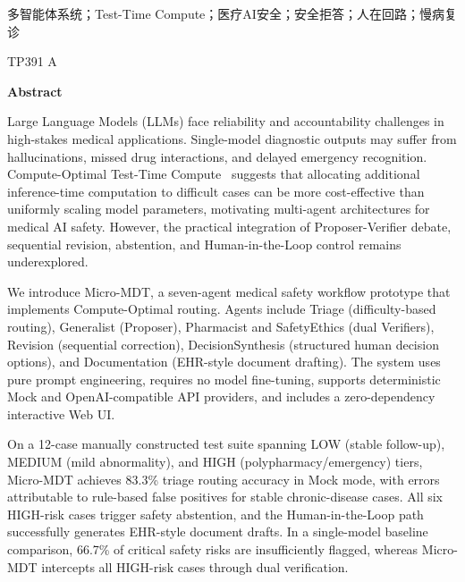 \documentclass[11pt,a4paper]{ctexart}
\begin{document}
\vspace{1em}
 多智能体系统；Test-Time Compute；医疗AI安全；安全拒答；人在回路；慢病复诊

\vspace{1em}
 TP391  A

\newpage
\begin{center}
    {\large \textbf{Abstract}}
\end{center}

 Large Language Models (LLMs) face reliability and accountability challenges in high-stakes medical applications. Single-model diagnostic outputs may suffer from hallucinations, missed drug interactions, and delayed emergency recognition. Compute-Optimal Test-Time Compute~\cite{snell2024scaling} suggests that allocating additional inference-time computation to difficult cases can be more cost-effective than uniformly scaling model parameters, motivating multi-agent architectures for medical AI safety. However, the practical integration of Proposer-Verifier debate, sequential revision, abstention, and Human-in-the-Loop control remains underexplored.

 We introduce Micro-MDT, a seven-agent medical safety workflow prototype that implements Compute-Optimal routing. Agents include Triage (difficulty-based routing), Generalist (Proposer), Pharmacist and SafetyEthics (dual Verifiers), Revision (sequential correction), DecisionSynthesis (structured human decision options), and Documentation (EHR-style document drafting). The system uses pure prompt engineering, requires no model fine-tuning, supports deterministic Mock and OpenAI-compatible API providers, and includes a zero-dependency interactive Web UI.

 On a 12-case manually constructed test suite spanning LOW (stable follow-up), MEDIUM (mild abnormality), and HIGH (polypharmacy/emergency) tiers, Micro-MDT achieves 83.3\% triage routing accuracy in Mock mode, with errors attributable to rule-based false positives for stable chronic-disease cases. All six HIGH-risk cases trigger safety abstention, and the Human-in-the-Loop path successfully generates EHR-style document drafts. In a single-model baseline comparison, 66.7\% of critical safety risks are insufficiently flagged, whereas Micro-MDT intercepts all HIGH-risk cases through dual verification.
\end{document}
